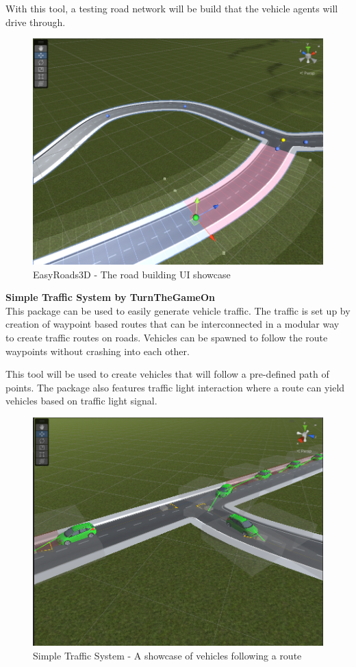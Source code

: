 \documentclass[main.tex]{subfiles}
\begin{document}
With this tool, a testing road network will be build that the vehicle agents will drive through.

\begin{figure}[htbp]
    \centering
    \includegraphics[width=.8\textwidth]{easy-roads.png}
    \caption{EasyRoads3D - The road building UI showcase}
    \label{fig-easyroads}
\end{figure}

\textbf{Simple Traffic System by TurnTheGameOn} \smallskip \\
This package can be used to easily generate vehicle traffic. The traffic is set up by creation
of waypoint based routes that can be interconnected in a modular way to create traffic routes
on roads. Vehicles can be spawned to follow the route waypoints without crashing into each other.

This tool will be used to create vehicles that will follow a pre-defined path of points. 
The package also features traffic light interaction where a route can yield vehicles based 
on traffic light signal. 

\begin{figure}[htbp]
    \centering
    \includegraphics[width=.8\textwidth]{simple-traffic-system.png} 
    \caption{Simple Traffic System - A showcase of vehicles following a route}
    \label{fig-sts}
\end{figure}
\end{document}

